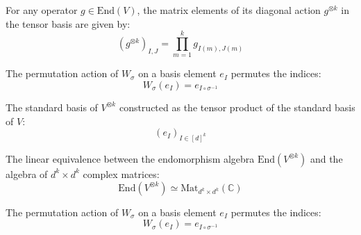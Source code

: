 \begin{lemma}\label{lem:toEndMatrix'_diagAction}
  \leanok
  For any operator $g \in \text{End}(V)$, the matrix elements of its diagonal action $g^{\otimes k}$ in the tensor basis are given by:
  \begin{equation}
    (g^{\otimes k})_{I, J} = \prod_{m=1}^k g_{I(m), J(m)}
  \end{equation}
\end{lemma}

\begin{lemma}\label{lem:permAction_tensorBasis'}
  \leanok
  The permutation action of $W_\sigma$ on a basis element $e_I$ permutes the indices:
  \begin{equation}
    W_\sigma(e_I) = e_{I \circ \sigma^{-1}}
  \end{equation}
\end{lemma}

\begin{definition}\label{def:tensorBasis}
  \leanok
  The standard basis of $V^{\otimes k}$ constructed as the tensor product of the standard basis of $V$:
  \begin{equation}
    (e_I)_{I \in [d]^k}
  \end{equation}
\end{definition}

\begin{definition}\label{def:toEndMatrix}
  \leanok
  The linear equivalence between the endomorphism algebra $\text{End}(V^{\otimes k})$ and the algebra of $d^k \times d^k$ complex matrices:
  \begin{equation}
    \text{End}(V^{\otimes k}) \simeq \text{Mat}_{d^k \times d^k}(\mathbb{C})
  \end{equation}
\end{definition}

\begin{lemma}\label{lem:permAction_tensorBasis}
  \leanok
  The permutation action of $W_\sigma$ on a basis element $e_I$ permutes the indices:
  \begin{equation}
    W_\sigma(e_I) = e_{I \circ \sigma^{-1}}
  \end{equation}
\end{lemma}

